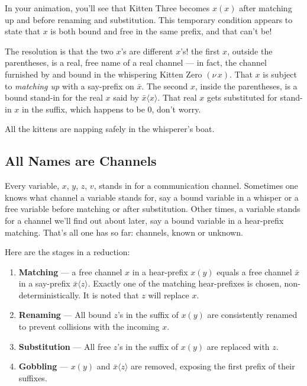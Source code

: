\documentclass[10pt,oneside,x11names]{article}
\theoremstyle{definition}
\theoremstyle{warning}
\begin{document}
In your animation, you'll see that Kitten Three becomes \(x(x)\)
after matching up and before renaming and substitution. This
temporary condition appears to state that \(x\) is both bound
and free in the same prefix, and that can't be!

The resolution is that the two \(x\)'s are different \(x\)'s! the
first \(x\), outside the parentheses, is a real, free name of a
real channel --- in fact, the channel furnished by and bound
in the whispering Kitten Zero \((\nu\,x)\). That \(x\) is subject
to \emph{matching up} with a say-prefix on \(\bar{x}\). The second
\(x\), inside the parentheses, is a bound stand-in for the real
\(x\) said by  \(\bar{x}\langle{x}\rangle\). That real \(x\) gets
substituted for stand-in \(x\) in the suffix, which happens to
be \(0\), don't worry.

All the kittens are napping safely in the whisperer's boat.

\subsection{All Names are Channels}
\label{sec:org05ca399}

Every variable, \(x\), \(y\), \(z\), \(v\), stands in for a
communication channel. Sometimes one knows what channel a
variable stands for, say a bound variable in a whisper or a
free variable before matching or after substitution. Other
times, a variable stands for a channel we'll find out about
later, say a bound variable in a hear-prefix matching. That's
all one has so far: channels, known or unknown.

Here are the stages in a reduction:

\begin{enumerate}
\item \textbf{Matching} --- a free channel \(x\) in a hear-prefix
\(x(y)\) equals a free channel \(\bar{x}\) in a say-prefix
\(\bar{x}\langle{z}\rangle\). Exactly one of the matching
hear-prefixes is chosen, non-deterministically. It is noted
that \(z\) will replace \(x\).

\item \textbf{Renaming} --- All bound \(z\)'s in the suffix of
\(x(y)\) are consistently renamed to prevent collisions with
the incoming \(x\).

\item \textbf{Substitution} --- All free \(z\)'s in the suffix of
\(x(y)\) are replaced with \(z\).

\item \textbf{Gobbling} --- \(x(y)\) and \(\bar{x}\langle{z}\rangle\)
are removed, exposing the first prefix of their suffixes.
\end{enumerate}
\end{document}
